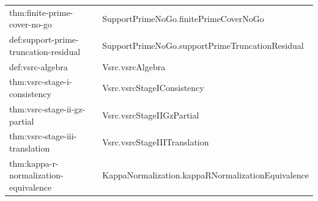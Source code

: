 \begin{small}
\begin{longtable}{@{}>{\ttfamily\raggedright\arraybackslash}p{} >{\ttfamily\raggedright\arraybackslash}p{}@{}}
thm:\allowbreak finite-\allowbreak prime-\allowbreak cover-\allowbreak no-\allowbreak go & Support\allowbreak Prime\allowbreak No\allowbreak Go.\allowbreak finite\allowbreak Prime\allowbreak Cover\allowbreak No\allowbreak Go \\
def:\allowbreak support-\allowbreak prime-\allowbreak truncation-\allowbreak residual & Support\allowbreak Prime\allowbreak No\allowbreak Go.\allowbreak support\allowbreak Prime\allowbreak Truncation\allowbreak Residual \\
def:\allowbreak vsrc-\allowbreak algebra & Vsrc.\allowbreak vsrc\allowbreak Algebra \\
thm:\allowbreak vsrc-\allowbreak stage-\allowbreak i-\allowbreak consistency & Vsrc.\allowbreak vsrc\allowbreak Stage\allowbreak IConsistency \\
thm:\allowbreak vsrc-\allowbreak stage-\allowbreak ii-\allowbreak gz-\allowbreak partial & Vsrc.\allowbreak vsrc\allowbreak Stage\allowbreak IIGz\allowbreak Partial \\
thm:\allowbreak vsrc-\allowbreak stage-\allowbreak iii-\allowbreak translation & Vsrc.\allowbreak vsrc\allowbreak Stage\allowbreak IIITranslation \\
thm:\allowbreak kappa-\allowbreak r-\allowbreak normalization-\allowbreak equivalence & Kappa\allowbreak Normalization.\allowbreak kappa\allowbreak RNormalization\allowbreak Equivalence \\
\end{longtable}
\end{small}
